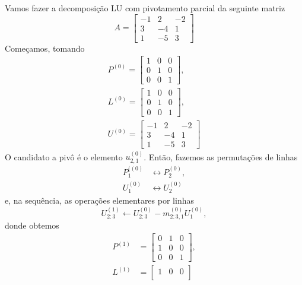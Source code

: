 \begin{ex}\label{cap_sislin_sec_lu:ex:lup}
  Vamos fazer a decomposição LU com pivotamento parcial da seguinte matriz
  \begin{equation}
    A = \begin{bmatrix}
      -1 & 2 & -2\\
      3 & -4 & 1\\
      1 & -5 & 3
    \end{bmatrix}
  \end{equation}
  Começamos, tomando
  \begin{align}
    P^{(0)} =
    \begin{bmatrix}
      1 & 0 & 0\\
      0 & 1 & 0\\
      0 & 0 & 1
    \end{bmatrix},\\
    L^{(0)} =
    \begin{bmatrix}
      1 & 0 & 0\\
      0 & 1 & 0\\
      0 & 0 & 1      
    \end{bmatrix},\\
    U^{(0)} = 
    \begin{bmatrix}
      -1 & 2 & -2\\
      3 & -4 & 1\\
      1 & -5 & 3
    \end{bmatrix}
  \end{align}
  O candidato a pivô é o elemento $u^{(0)}_{2,1}$. Então, fazemos as permutações de linhas
  \begin{align}
    P_1^{((0)} &\leftrightarrow P_2^{(0)},\\
    U_1^{(0)} &\leftrightarrow U_2^{(0)}
  \end{align}
  e, na sequência, as operações elementares por linhas
  \begin{equation}
    U_{2:3}^{(1)}\leftarrow U_{2:3}^{(0)}-m^{(0)}_{2:3,1}U_1^{(0)},
  \end{equation}
  donde obtemos
  \begin{align}
    P^{(1)} &=
    \begin{bmatrix}
      0 & 1 & 0\\
      1 & 0 & 0\\
      0 & 0 & 1
    \end{bmatrix},\\
    L^{(1)} &=
    \begin{bmatrix}
      1 & 0 & 0\\

\end{bmatrix}
\end{align}
\end{ex}
